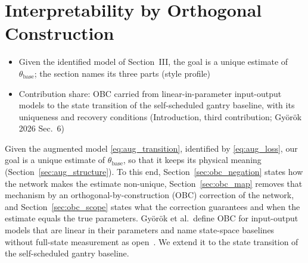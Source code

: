 \section{Interpretability by Orthogonal Construction}\label{sec:obc}
\ifdraft
\begin{itemize}
\item Given the identified model of Section~III, the goal is a unique estimate of $\theta_{\mathrm{base}}$; the section names its three parts (style profile)
\item Contribution share: OBC carried from linear-in-parameter input-output models to the state transition of the self-scheduled gantry baseline, with its uniqueness and recovery conditions (Introduction, third contribution; Gy\"or\"ok 2026 Sec.~6)
\end{itemize}
\fi

Given the augmented model \eqref{eq:aug_transition}, identified by
\eqref{eq:aug_loss}, our goal is a unique estimate of
$\theta_{\mathrm{base}}$, so that it keeps its physical meaning
(Section~\ref{sec:aug_structure}).
To this end, Section~\ref{sec:obc_negation} states how the network makes the
estimate non-unique, Section~\ref{sec:obc_map} removes that mechanism by an
orthogonal-by-construction (OBC) correction of the network, and
Section~\ref{sec:obc_scope} states what the correction guarantees and when the
estimate equals the true parameters.
Gy\"or\"ok et al.\ define OBC for input-output models that are linear in their
parameters and name state-space baselines without full-state measurement as
open~\cite[Sec.~6]{gyorok2026obc}.
We extend it to the state transition of the self-scheduled gantry baseline.

